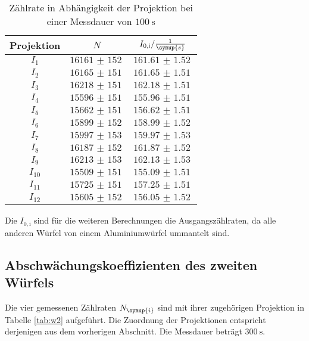 \begin{table}[H]
  \centering
  \caption{Zählrate in Abhängigkeit der Projektion bei einer Messdauer von $\SI{100}{\second}$ }
  \label{tab:w1}
  \begin{tabular}{c c c}
    \toprule
    Projektion & $N$ & $I_{0,\mathrm{i}} / \frac{1}{\symup{s}}$  \\
    \midrule
        $I_1$    & $\SI{16161(152)}{}$ & $\SI{161.61(152)}{}$    \\
        $I_2$    & $\SI{16165(151)}{}$ & $\SI{161.65(151)}{}$    \\
        $I_3$    & $\SI{16218(151)}{}$ & $\SI{162.18(151)}{}$    \\
        $I_4$    & $\SI{15596(151)}{}$ & $\SI{155.96(151)}{}$    \\
        $I_5$    & $\SI{15662(151)}{}$ & $\SI{156.62(151)}{}$    \\
        $I_6$    & $\SI{15899(152)}{}$ & $\SI{158.99(152)}{}$    \\
        $I_7$    & $\SI{15997(153)}{}$ & $\SI{159.97(153)}{}$    \\
        $I_8$    & $\SI{16187(152)}{}$ & $\SI{161.87(152)}{}$    \\
        $I_9$    & $\SI{16213(153)}{}$ & $\SI{162.13(153)}{}$    \\
        $I_{10}$ & $\SI{15509(151)}{}$ & $\SI{155.09(151)}{}$   \\
        $I_{11}$ & $\SI{15725(151)}{}$ & $\SI{157.25(151)}{}$    \\
        $I_{12}$ & $\SI{15605(152)}{}$ & $\SI{156.05(152)}{}$    \\
    \bottomrule
  \end{tabular}
\end{table}

Die $I_{0,\mathrm{i}}$ sind für die weiteren Berechnungen die Ausgangszählraten,
da alle anderen Würfel von einem Aluminiumwürfel ummantelt sind.


\subsection{Abschwächungskoeffizienten des zweiten Würfels}

Die vier gemessenen Zählraten $N_\symup{i}$ sind mit ihrer zugehörigen Projektion in Tabelle
\ref{tab:w2} aufgeführt. Die Zuordnung der Projektionen entspricht derjenigen aus dem
vorherigen Abschnitt. Die Messdauer beträgt $\SI{300}{\second}$.

